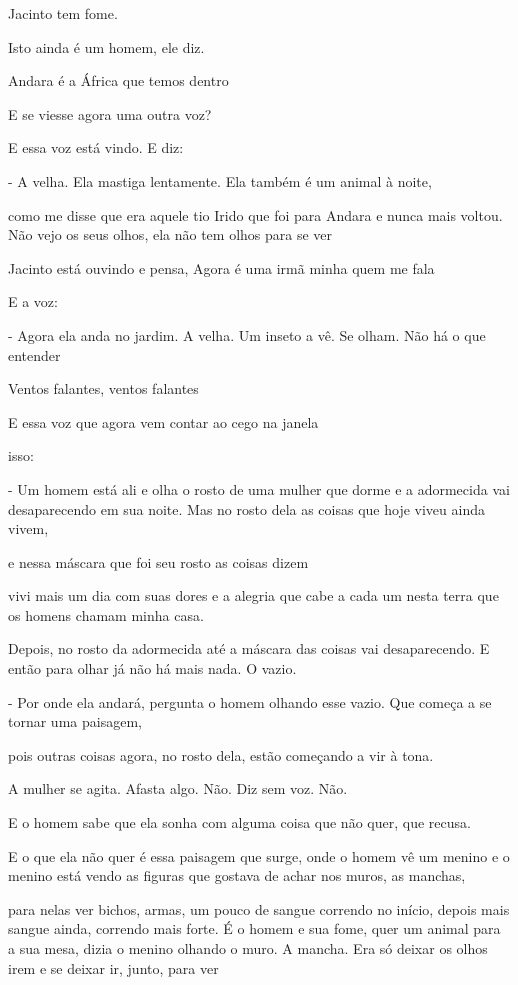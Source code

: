 Jacinto tem fome.

Isto ainda é um homem, ele diz.

Andara é a África que temos dentro

E se viesse agora uma outra voz?

E essa voz está vindo. E diz:

- A velha. Ela mastiga lentamente. Ela também é um animal à noite,

como me disse que era aquele tio Irido que foi para Andara e nunca mais
voltou. Não vejo os seus olhos, ela não tem olhos para se ver

Jacinto está ouvindo e pensa, Agora é uma irmã minha quem me fala

E a voz:

- Agora ela anda no jardim. A velha. Um inseto a vê. Se olham. Não há o
que entender

Ventos falantes, ventos falantes

E essa voz que agora vem contar ao cego na janela

isso:

- Um homem está ali e olha o rosto de uma mulher que dorme e a
adormecida vai desaparecendo em sua noite. Mas no rosto dela as coisas
que hoje viveu ainda vivem,

e nessa máscara que foi seu rosto as coisas dizem

vivi mais um dia com suas dores e a alegria que cabe a cada um nesta
terra que os homens chamam minha casa.

Depois, no rosto da adormecida até a máscara das coisas vai
desaparecendo. E então para olhar já não há mais nada. O vazio.

- Por onde ela andará, pergunta o homem olhando esse vazio. Que começa a
se tornar uma paisagem,

pois outras coisas agora, no rosto dela, estão começando a vir à tona.

A mulher se agita. Afasta algo. Não. Diz sem voz. Não.

E o homem sabe que ela sonha com alguma coisa que não quer, que recusa.

E o que ela não quer é essa paisagem que surge, onde o homem vê um
menino e o menino está vendo as figuras que gostava de achar nos muros,
as manchas,

para nelas ver bichos, armas, um pouco de sangue correndo no início,
depois mais sangue ainda, correndo mais forte. É o homem e sua fome,
quer um animal para a sua mesa, dizia o menino olhando o muro. A mancha.
Era só deixar os olhos irem e se deixar ir, junto, para ver

